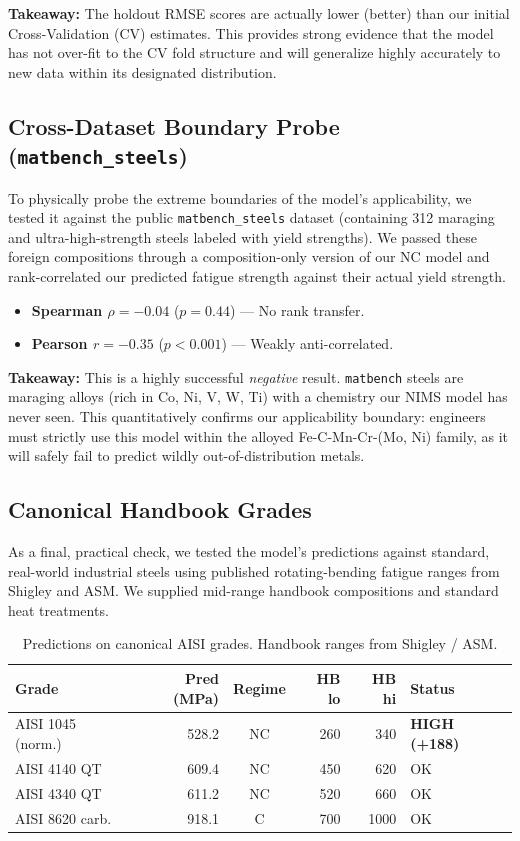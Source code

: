 \documentclass[12pt,a4paper]{article}
\begin{document}
\textbf{Takeaway:} The holdout RMSE scores are actually lower (better) than our initial Cross-Validation (CV) estimates. This provides strong evidence that the model has not over-fit to the CV fold structure and will generalize highly accurately to new data within its designated distribution.

\subsection{Cross-Dataset Boundary Probe (\texttt{matbench\_steels})}
To physically probe the extreme boundaries of the model's applicability, we tested it against the public \texttt{matbench\_steels} dataset (containing 312 maraging and ultra-high-strength steels labeled with yield strengths). We passed these foreign compositions through a composition-only version of our NC model and rank-correlated our predicted fatigue strength against their actual yield strength.

\begin{itemize}[nosep]
  \item \textbf{Spearman $\rho = -0.04$} ($p = 0.44$) — No rank transfer.
  \item \textbf{Pearson $r = -0.35$} ($p < 0.001$) — Weakly anti-correlated.
\end{itemize}

\textbf{Takeaway:} This is a highly successful \emph{negative} result. \texttt{matbench} steels are maraging alloys (rich in Co, Ni, V, W, Ti) with a chemistry our NIMS model has never seen. This quantitatively confirms our applicability boundary: engineers must strictly use this model within the alloyed Fe-C-Mn-Cr-(Mo, Ni) family, as it will safely fail to predict wildly out-of-distribution metals.

\subsection{Canonical Handbook Grades}
As a final, practical check, we tested the model's predictions against standard, real-world industrial steels using published rotating-bending fatigue ranges from Shigley and ASM. We supplied mid-range handbook compositions and standard heat treatments.

\begin{table}[H]
\centering
\caption{Predictions on canonical AISI grades. Handbook ranges from Shigley / ASM.}
\label{tab:grades}
\begin{tabular}{lrcrrl}
\toprule
\textbf{Grade} & \textbf{Pred (MPa)} & \textbf{Regime} & \textbf{HB lo} & \textbf{HB hi} & \textbf{Status} \\
\midrule
AISI 1045 (norm.)    & 528.2 & NC & 260 & 340  & \textbf{HIGH (+188)} \\
AISI 4140 QT         & 609.4 & NC & 450 & 620  & OK                   \\
AISI 4340 QT         & 611.2 & NC & 520 & 660  & OK                   \\
AISI 8620 carb.      & 918.1 & C  & 700 & 1000 & OK                   \\
\bottomrule
\end{tabular}
\end{table}
\end{document}
